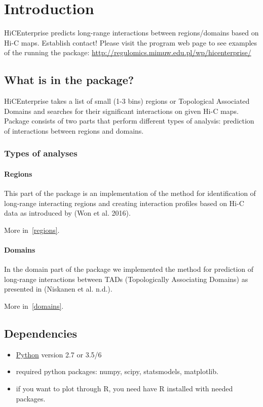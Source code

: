 \chapter{Introduction}
\label{intro}

HiCEnterprise predicts long-range interactions between regions/domains based on Hi-C maps.
Establish contact! Please visit the program web page to see examples of the running the package: \url{http://regulomics.mimuw.edu.pl/wp/hicenterprise/}

\section{What is in the package?}
HiCEnterprise takes a list of small (1-3 bins) regions or Topological Associated Domains and searches for their significant interactions on given Hi-C maps.
Package consists of two parts that perform different types of analysis: prediction of interactions between regions and domains.

\subsection{Types of analyses}

\subsubsection{Regions}
This part of the package is an implementation of the method for identification of long-range interacting regions and
creating interaction profiles based on Hi-C data as introduced by (Won et al. 2016).

More in~\ref{regions}.

\subsubsection{Domains}
In the domain part of the package we implemented the method for prediction of long-range interactions between TADs
(Topologically Associating Domains) as presented in (Niskanen et al. n.d.).

More in~\ref{domains}.

\section{Dependencies}
\begin{itemize}
\item \href{https://www.python.org}{Python} version 2.7 or 3.5/6
\item required python packages: numpy, scipy, statsmodels, matplotlib.
\item if you want to plot through R, you need have R installed with needed packages.

\end{itemize}

